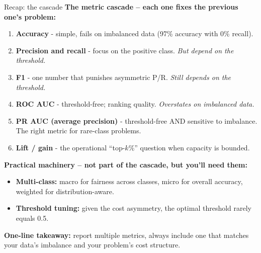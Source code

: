 \documentclass[aspectratio=169]{beamer}
\begin{document}
\begin{frame}{Recap: the cascade}
  \textbf{The metric cascade -- each one fixes the previous one's problem:}
  \begin{enumerate}\small
    \item \textbf{Accuracy} - simple, fails on imbalanced data (97\% accuracy with 0\% recall).
    \item \textbf{Precision and recall} - focus on the positive class. \emph{But depend on the threshold.}
    \item \textbf{F1} - one number that punishes asymmetric P/R. \emph{Still depends on the threshold.}
    \item \textbf{ROC AUC} - threshold-free; ranking quality. \emph{Overstates on imbalanced data.}
    \item \textbf{PR AUC (average precision)} - threshold-free AND sensitive to imbalance. The right metric for rare-class problems.
    \item \textbf{Lift / gain} - the operational ``top-$k$\%'' question when capacity is bounded.
  \end{enumerate}
  \vskip 4pt
  \textbf{Practical machinery -- not part of the cascade, but you'll need them:}
  \begin{itemize}\small
    \item \textbf{Multi-class:} macro for fairness across classes, micro for overall accuracy, weighted for distribution-aware.
    \item \textbf{Threshold tuning:} given the cost asymmetry, the optimal threshold rarely equals 0.5.
  \end{itemize}
  \vskip 4pt
  \footnotesize \textbf{One-line takeaway:} report multiple metrics, always include one that matches your data's imbalance and your problem's cost structure.
\end{frame}
\end{document}
